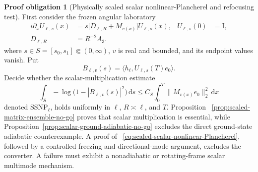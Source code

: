 \documentclass[11pt]{article}
\newcommand{\Id}{\mathrm I}
\newcommand{\dd}{\,\mathrm d}
\theoremstyle{definition}
\newtheorem{problem}[theorem]{Proof obligation}
\theoremstyle{remark}
\begin{document}
\begin{problem}[Physically scaled scalar nonlinear-Plancherel and refocusing test]
\label{prob:achromatic-phase-mask-refocusing}
First consider the frozen angular laboratory
\begin{equation}
 \begin{aligned}
 i\partial_xU_{\ell,s}(x)
 &=s\bigl[D_{\ell,R}+M_{v(x)}\bigr]U_{\ell,s}(x),
 &U_{\ell,s}(0)&=\Id,\\
 D_{\ell,R}&=R^{-2}A_3.
 \end{aligned}
 \label{eq:scaled-scalar-angular-laboratory}
\end{equation}
where $s\in S=[s_0,s_1]\Subset(0,\infty)$, $v$ is real and bounded, and its
endpoint values vanish.  Put
\begin{equation}
 B_{\ell,v}(s)=\langle h_\ell,U_{\ell,s}(T)e_0\rangle.
\end{equation}
Decide whether the scalar-multiplication estimate
\begin{equation}
 \int_S-\log\bigl(1-|B_{\ell,v}(s)|^2\bigr)\dd s
 \leq C_S\int_0^T\|M_{v(x)}e_0\|_2^2\dd x
 \label{eq:scaled-scalar-nonlinear-Plancherel}
\end{equation}
denoted $\mathrm{SSNP}_\ell$, holds uniformly in $\ell$, $R\asymp\ell$, and
$T$.  Proposition
~\ref{prop:scaled-matrix-ensemble-no-go} proves that scalar multiplication is
essential, while Proposition~\ref{prop:scalar-ground-adiabatic-no-go} excludes
the direct ground-state adiabatic counterexample.  A proof of
~\eqref{eq:scaled-scalar-nonlinear-Plancherel}, followed by a controlled
freezing and directional-mode argument, excludes the converter.  A failure
must exhibit a nonadiabatic or rotating-frame scalar multimode mechanism.


\end{problem}
\end{document}
